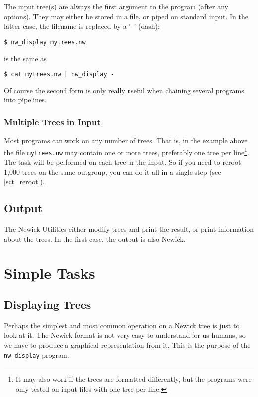 \documentclass[a4paper,10pt]{report}
\newcommand{\nutils}{Newick Utilities}
\newcommand{\stdin}{standard input}
\newcommand{\nw}{Newick}
\newcommand{\display}{\texttt{nw\_display}}
\theoremstyle{definition}
\theoremstyle{definition}
\begin{document}
The input tree(s) are always the first argument to the program (after any options). They may either be stored in a file, or piped on \stdin{}. In the latter case, the filename is replaced by a '\texttt{-}' (dash):

\begin{samepage}
\begin{verbatim}
$ nw_display mytrees.nw
\end{verbatim}
is the same as
\begin{verbatim}
$ cat mytrees.nw | nw_display -
\end{verbatim}
\end{samepage}
Of course the second form is only really useful when chaining several programs into pipelines.

\subsection{Multiple Trees in Input}

Most programs can work on any number of trees. That is, in the example above the file \texttt{mytrees.nw} may contain one or more trees, preferably one tree per line\footnote{It may also work if the trees are formatted differently, but the programs were only tested on input files with one tree per line.}. The task will be performed on each tree in the input. So if you need to reroot 1,000 trees on the same outgroup, you can do it all in a single step (see \ref{sct_reroot}).

\section{Output}
\label{sect_output}

The \nutils{} either modify trees and print the result, or print information about the trees. In the first case, the output is also Newick.

\chapter{Simple Tasks}
\label{chap_simple}

\section{Displaying Trees}
\label{sct_display}

Perhaps the simplest and most common operation on a \nw{} tree is just to look at it. The \nw{} format is not very easy to understand for us humans, so we have to produce a graphical representation from it. This is the purpose of the \display{} program. 
\end{document}
